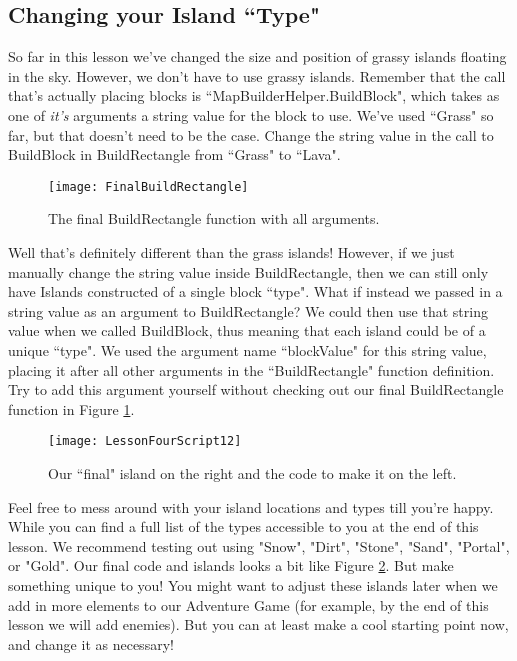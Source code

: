 \documentclass{article}
\begin{document}
\subsection{Changing your Island ``Type"}

So far in this lesson we've changed the size and position of grassy islands floating in the sky. However, we don't have to use grassy islands. Remember that the call that's actually placing blocks is ``MapBuilderHelper.BuildBlock", which takes as one of \textit{it's} arguments a string value for the block to use. We've used ``Grass" so far, but that doesn't need to be the case. Change the string value in the call to BuildBlock in BuildRectangle from ``Grass" to ``Lava". 

\noindent{}
\begin{figure}
  \texttt{[image: FinalBuildRectangle]}
  \caption{The final BuildRectangle function with all arguments.}
  \label{fig:FinalBuildRectangle}
\end{figure}
Well that's definitely different than the grass islands! However, if we just manually change the string value inside BuildRectangle, then we can still only have Islands constructed of a single block ``type". What if instead we passed in a string value as an argument to BuildRectangle? We could then use that string value when we called BuildBlock, thus meaning that each island could be of a unique ``type". We used the argument name ``blockValue" for this string value, placing it after all other arguments in the ``BuildRectangle" function definition. Try to add this argument yourself without checking out our final BuildRectangle function in Figure \ref{fig:FinalBuildRectangle}. 
\begin{figure}
  \texttt{[image: LessonFourScript12]}
  \caption{Our ``final" island on the right and the code to make it on the left.}
  \label{fig:LessonFourScript12}
\end{figure}
Feel free to mess around with your island locations and types till you're happy. While you can find a full list of the types accessible to you at the end of this lesson. We recommend testing out using "Snow", "Dirt", "Stone", "Sand", "Portal", or "Gold". Our final code and islands looks a bit like Figure \ref{fig:LessonFourScript12}. But make something unique to you! You might want to adjust these islands later when we add in more elements to our Adventure Game (for example, by the end of this lesson we will add enemies). But you can at least make a cool starting point now, and change it as necessary! 
\end{document}
